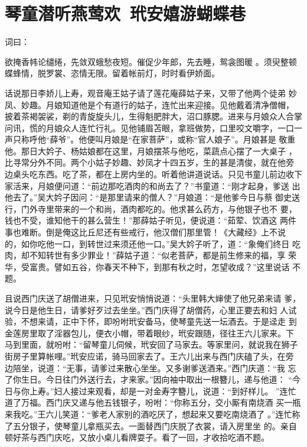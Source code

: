\chapter{琴童潜听燕莺欢~玳安嬉游蝴蝶巷}

词曰：

欲掩香帏论缱绻，先敛双蛾愁夜短。催促少年郎，先去睡，鸳衾图暖
。须臾整顿蝶蜂情，脱罗裳、恣情无限。留着帐前灯，时时看伊娇面。

话说那日李娇儿上寿，观音庵王姑子请了莲花庵薛姑子来，又带了他两个徒弟
妙凤、妙趣。月娘知道他是个有道行的姑子，连忙出来迎接。见他戴着清净僧帽，
披着茶褐袈裟，剃的青旋旋头儿，生得魁肥胖大，沼口豚腮。进来与月娘众人合掌
问讯，慌的月娘众人连忙行礼。见他铺眉苫眼，拿班做势，口里咬文嚼字，一口一
声只称呼他“薛爷”。他便叫月娘是“在家菩萨”，或称“官人娘子”。月娘甚是
敬重他。那日大妗子、杨姑娘都在这里，月娘摆茶与他吃，菜蔬点心摆了一大桌子
，比寻常分外不同。两个小姑子妙趣、妙凤才十四五岁，生的甚是清俊，就在他旁
边桌头吃东西。吃了茶，都在上房内坐的。听着他讲道说话。只见书童儿前边收下
家活来，月娘便问道：“前边那吃酒肉的和尚去了？”书童道：“刚才起身，爹送
出他去了。”吴大妗子因问：“是那里请来的僧人？”月娘道：“是他爹今日与蔡
御史送行，门外寺里带来的一个和尚，酒肉都吃的。他求甚么药方，与他银子也不
要，钱也不受，谁知他干的甚么营生！”那薛姑子听见，便说道：“茹荤、饮酒这
两件事也难断。倒是俺这比丘尼还有些戒行，他汉僧们那里管！《大藏经》上不说
的，如你吃他一口，到转世过来须还他一口。”吴大妗子听了，道：“象俺们终日
吃肉，却不知转世有多少罪业！”薛姑子道：“似老菩萨，都是前生修来的福，享
荣华，受富贵。譬如五谷，你春天不种下，到那有秋之时，怎望收成？”这里说话
不题。

且说西门庆送了胡僧进来，只见玳安悄悄说道：“头里韩大婶使了他兄弟来请
爹，说今日是他生日，请爹好歹过去坐坐。”西门庆得了胡僧药，心里正要去和妇
人试验，不想来请，正中下怀，即吩咐玳安备马，使琴童先送一坛酒去。于是迳走
到金莲房里取了淫器包儿，便衣小帽，带着眼纱，玳安跟随，径往王六儿家来。下
马到里面，就吩咐：“留琴童儿伺候，玳安回了马家去。等家里问，就说我在狮子
街房子里算帐哩。”玳安应诺，骑马回家去了。王六儿出来与西门庆磕了头，在旁
边陪坐，说道：“无事，请爹过来散心坐坐。又多谢爹送酒来。”西门庆道：“我
忘了你生日。今日往门外送行去，才来家。”因向袖中取出一根簪儿，递与他道：
“今日与你上寿。”妇人接过来观看，却是一对金寿字簪儿，说道：“到好样儿。
”连忙道了万福。西门庆又递与他五钱银子，吩咐：“你称五分，交小厮有南烧酒
买一瓶来我吃。”王六儿笑道：“爹老人家别的酒吃厌了，想起来又要吃南烧酒了
。”连忙称了五分银子，使琴童儿拿瓶买去。一面替西门庆脱了衣裳，请入房里坐
的。亲自顿好茶与西门庆吃，又放小桌儿看牌耍子。看了一回，才收拾吃酒不题。

